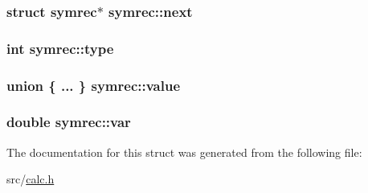 \subsubsection[{next}]{\setlength{\rightskip}{0pt plus 5cm}struct {\bf symrec}$\ast$ symrec\+::next}\label{structsymrec_a799aa9b5b3ee76aa0634b0ad96f80ea1}
\hypertarget{structsymrec_a3ed0bae32ad0e16423a49153484094f8}{}
\subsubsection[{type}]{\setlength{\rightskip}{0pt plus 5cm}int symrec\+::type}\label{structsymrec_a3ed0bae32ad0e16423a49153484094f8}
\hypertarget{structsymrec_aabe0b508928c6472fcbdf5071c33b61a}{}
\subsubsection[{value}]{\setlength{\rightskip}{0pt plus 5cm}union \{ ... \}   symrec\+::value}\label{structsymrec_aabe0b508928c6472fcbdf5071c33b61a}
\hypertarget{structsymrec_af3db0c7e569f93a9d7385d5b170578f8}{}
\subsubsection[{var}]{\setlength{\rightskip}{0pt plus 5cm}double symrec\+::var}\label{structsymrec_af3db0c7e569f93a9d7385d5b170578f8}


The documentation for this struct was generated from the following file\+:\begin{DoxyCompactItemize}
\item 
src/\hyperlink{calc_8h}{calc.\+h}\end{DoxyCompactItemize}
